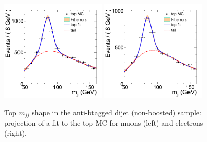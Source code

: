 \begin{figure}
\begin{center}
\includegraphics[width=0.45\textwidth]{figs/wpj/Dibosonlnujj_top_muon_2jets.png}
\includegraphics[width=0.45\textwidth]{figs/wpj/Dibosonlnujj_top_electron_2jets.png}
\end{center}
\caption{\label{fig:topFit} Top $m_{jj}$ shape in the anti-btagged dijet (non-boosted) sample: projection of a fit to the top MC for muons (left) and electrons (right).}
\label{fig:topFit_Dijet}
\end{figure}
